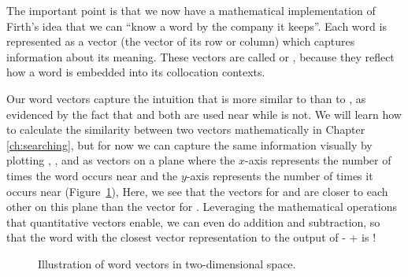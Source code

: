 The important point is that we now have a mathematical implementation
of Firth's idea that we can ``know a word by the company it keeps''.
Each word is represented as a vector (the vector of its row or column)
which captures information about its meaning.  These vectors are
called  or , because
they reflect how a word is embedded into its collocation contexts.

Our word vectors capture the intuition that  is more
similar to  than to , as evidenced by the
fact that  and  both are used near
 while  is not.  We will learn how to
calculate the similarity between two vectors mathematically in Chapter
\ref{ch:searching}, but for now we can capture the same information
visually by plotting , , and 
as vectors on a plane where the $x$-axis represents the number of times
the word occurs near  and the $y$-axis represents the
number of times it occurs near  (Figure~\ref{fig:word-vectors}), Here, we see that the vectors for
 and  are closer to each other on this plane
than the vector for .  Leveraging the mathematical operations that quantitative vectors enable, we can even do addition and subtraction, so that the word with the closest vector representation to the output of  -  +  is  \citep{Mikolov-etal:2013b}!  


\begin{figure}[htbp]
\small%
\caption{Illustration of word vectors in two-dimensional space.}
\label{fig:word-vectors}
\end{figure}

